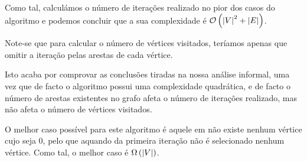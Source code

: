 Como tal, calculámos o número de iterações realizado no pior dos
casos do algoritmo e podemos concluir que a sua complexidade é
$\mathcal{O}\left( \left\lvert V \right\rvert^2 + \left\lvert E \right\rvert \right)$.

Note-se que para calcular o número de vértices visitados, teríamos apenas que
omitir a iteração pelas arestas de cada vértice.

Isto acaba por comprovar as conclusões tiradas na nossa análise informal, uma
vez que de facto o algoritmo possui uma complexidade quadrática, e de facto o
número de arestas existentes no grafo afeta o número de iterações realizado, mas
não afeta o número de vértices visitados.

O melhor caso possível para este algoritmo é aquele em não existe
nenhum vértice cujo  seja 0, pelo que aquando da
primeira iteração não é selecionado nenhum vértice. Como tal, o
melhor caso é $\Omega\left(\left\lvert V \right\rvert\right)$.
